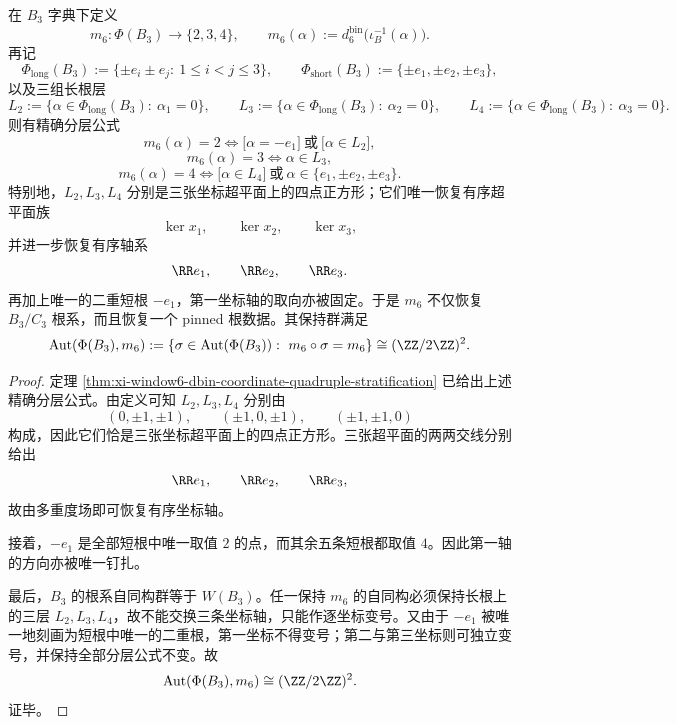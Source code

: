 \begin{theorem}\label{thm:conclusion-window6-multiplicity-pinning}
在 \(B_3\) 字典下定义
\[
m_6:\Phi(B_3)\longrightarrow \{2,3,4\},
\qquad
m_6(\alpha):=d_6^{\mathrm{bin}}\bigl(\iota_B^{-1}(\alpha)\bigr).
\]
再记
\[
\Phi_{\mathrm{long}}(B_3):=\{\pm e_i\pm e_j:\ 1\le i<j\le 3\},
\qquad
\Phi_{\mathrm{short}}(B_3):=\{\pm e_1,\pm e_2,\pm e_3\},
\]
以及三组长根层
\[
L_2:=\{\alpha\in \Phi_{\mathrm{long}}(B_3):\ \alpha_1=0\},
\qquad
L_3:=\{\alpha\in \Phi_{\mathrm{long}}(B_3):\ \alpha_2=0\},
\qquad
L_4:=\{\alpha\in \Phi_{\mathrm{long}}(B_3):\ \alpha_3=0\}.
\]
则有精确分层公式
\[
m_6(\alpha)=2
\iff
\bigl[\alpha=-e_1\bigr]\ \text{或}\ \bigl[\alpha\in L_2\bigr],
\]
\[
m_6(\alpha)=3
\iff
\alpha\in L_3,
\]
\[
m_6(\alpha)=4
\iff
\bigl[\alpha\in L_4\bigr]\ \text{或}\ \alpha\in\{e_1,\pm e_2,\pm e_3\}.
\]
特别地，\(L_2,L_3,L_4\) 分别是三张坐标超平面上的四点正方形；它们唯一恢复有序超平面族
\[
\ker x_1,\qquad \ker x_2,\qquad \ker x_3,
\]
并进一步恢复有序轴系
\[
\RR e_1,\qquad \RR e_2,\qquad \RR e_3.
\]
再加上唯一的二重短根 \(-e_1\)，第一坐标轴的取向亦被固定。于是 \(m_6\) 不仅恢复 \(B_3/C_3\) 根系，而且恢复一个 pinned 根数据。其保持群满足
\[
\operatorname{Aut}(\Phi(B_3),m_6)
:=
\{\sigma\in \operatorname{Aut}(\Phi(B_3)):\ m_6\circ \sigma=m_6\}
\cong (\ZZ/2\ZZ)^2.
\]
\end{theorem}
\begin{proof}
定理 \ref{thm:xi-window6-dbin-coordinate-quadruple-stratification} 已给出上述精确分层公式。由定义可知 \(L_2,L_3,L_4\) 分别由
\[
(0,\pm 1,\pm 1),\qquad
(\pm 1,0,\pm 1),\qquad
(\pm 1,\pm 1,0)
\]
构成，因此它们恰是三张坐标超平面上的四点正方形。三张超平面的两两交线分别给出
\[
\RR e_1,\qquad \RR e_2,\qquad \RR e_3,
\]
故由多重度场即可恢复有序坐标轴。

接着，\(-e_1\) 是全部短根中唯一取值 \(2\) 的点，而其余五条短根都取值 \(4\)。因此第一轴的方向亦被唯一钉扎。

最后，\(B_3\) 的根系自同构群等于 \(W(B_3)\)。任一保持 \(m_6\) 的自同构必须保持长根上的三层 \(L_2,L_3,L_4\)，故不能交换三条坐标轴，只能作逐坐标变号。又由于 \(-e_1\) 被唯一地刻画为短根中唯一的二重根，第一坐标不得变号；第二与第三坐标则可独立变号，并保持全部分层公式不变。故
\[
\operatorname{Aut}(\Phi(B_3),m_6)\cong (\ZZ/2\ZZ)^2.
\]
证毕。
\end{proof}

